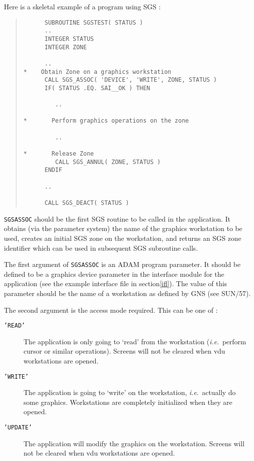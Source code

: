 \documentclass[twoside,11pt]{article}
\newcommand{\hyperref}[4]{#2\ref{#4}#3}
\newcommand{\htmlref}[2]{#1}
\newcommand{\xref}[3]{#1}
\renewcommand{\_}{\texttt{\symbol{95}}}
\begin{document}
Here is a skeletal example of a program using SGS :
\begin{quote}
\begin{verbatim}
      SUBROUTINE SGSTEST( STATUS )
      ..
      INTEGER STATUS
      INTEGER ZONE

      ..
*    Obtain Zone on a graphics workstation
      CALL SGS_ASSOC( 'DEVICE', 'WRITE', ZONE, STATUS )
      IF( STATUS .EQ. SAI__OK ) THEN

         ..

*       Perform graphics operations on the zone

         ..

*       Release Zone
         CALL SGS_ANNUL( ZONE, STATUS )
      ENDIF

      ..

      CALL SGS_DEACT( STATUS )

\end{verbatim}
\end{quote}

\htmlref{{\tt SGS\_ASSOC}}{SGS_ASSOC}
should be the first SGS routine to be called in the application.
It obtains (via the parameter system) the name of the graphics workstation
to be used, creates an initial SGS zone on the workstation, and returns an
SGS zone identifier which can be used in subsequent SGS subroutine calls.

The first argument of {\tt SGS\_ASSOC} is an ADAM program parameter.
It should be
defined to be a graphics device parameter in the interface module for the
application (see the
\hyperref{example interface file}{example interface file
in section}{}{ifl}). The value of
this parameter should be the name of a workstation as defined by GNS (see
\xref{SUN/57}{sun57}{GKSWorkstationNames}).

The second argument is the access mode required. This can be one of :
\begin{description}
\item[{\tt 'READ'}] The application is only going to `read' from the workstation
({\em i.e.}\ perform cursor or similar operations).
Screens will not be cleared when vdu workstations are opened.
\item[{\tt 'WRITE'}] The application is going to `write' on the workstation,
{\em i.e.}\ actually do some graphics.
Workstations are completely initialized when they are opened.
\item[{\tt 'UPDATE'}] The application will modify the graphics on the
workstation.
Screens will not be cleared when vdu workstations are opened.
\end{description}
\end{document}
